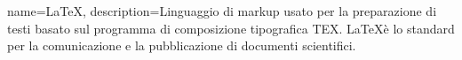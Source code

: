 {
	name=LaTeX,
	description={Linguaggio di markup usato per la preparazione di testi basato sul programma di composizione tipografica TEX. \LaTeX è lo standard per la comunicazione e la pubblicazione di documenti scientifici.}
}
